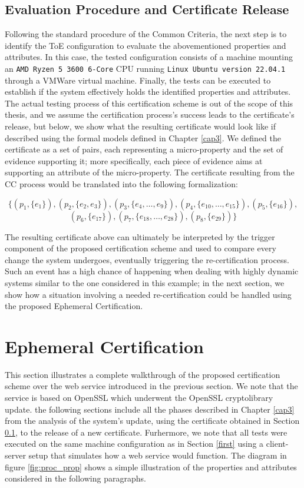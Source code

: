 \subsection{Evaluation Procedure and Certificate Release}
\label{firstcert}
Following the standard procedure of the Common Criteria, the next step is to identify the ToE configuration to evaluate the abovementioned properties and attributes. In this case, the tested configuration consists of a machine mounting an \texttt{AMD Ryzen 5 3600 6-Core} CPU running \texttt{Linux Ubuntu version 22.04.1} through a VMWare virtual machine. Finally, the tests can be executed to establish if the system effectively holds the identified properties and attributes. The actual testing process of this certification scheme is out of the scope of this thesis, and we assume the certification process's success leads to the certificate's release, but below, we show what the resulting certificate would look like if described using the formal models defined in Chapter \ref{cap3}. We defined the certificate as a set of pairs, each representing a micro-property and the set of evidence supporting it; more specifically, each piece of evidence aims at supporting an attribute of the micro-property. The certificate resulting from the CC process would be translated into the following formalization: 

\[\{ (p_1, \{e_1\}),(p_2, \{e_2, e_3\}),(p_3, \{e_4, \dots, e_9\}),(p_4, \{e_{10}, \dots, e_{15}\}),(p_5, \{e_{16}\}), \]
\[(p_6, \{e_{17}\}),(p_7, \{e_{18}, \dots, e_{28}\}),(p_8, \{e_{29}\}) \}\]

The resulting certificate above can ultimately be interpreted by the trigger component of the proposed certification scheme and used to compare every change the system undergoes, eventually triggering the re-certification process. Such an event has a high chance of happening when dealing with highly dynamic systems similar to the one considered in this example; in the next section, we show how a situation involving a needed re-certification could be handled using the proposed Ephemeral Certification.




\section{Ephemeral Certification}
This section illustrates a complete walkthrough of the proposed certification scheme over the web service introduced in the previous section. We note that the service is based on OpenSSL which underwent the OpenSSL cryptolibrary update. the following sections include all the phases described in Chapter \ref{cap3} from the analysis of the system's update, using the certificate obtained in Section \ref{firstcert}, to the release of a new certificate. Furhermore, we note that all tests were executed on the same machine configuration as in Section \ref{first} using a client-server setup that simulates how a web service would function. The diagram in figure \ref{fig:proc_prop} shows a simple illustration of the properties and attributes considered in the following paragraphs.

